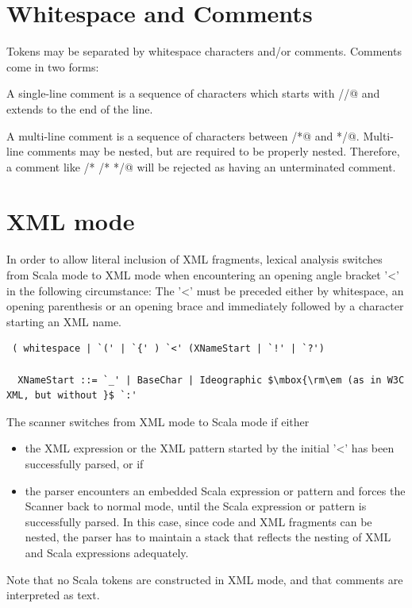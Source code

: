 \section{Whitespace and Comments}

Tokens may be separated by whitespace characters
and/or comments. Comments come in two forms:

A single-line comment is a sequence of characters which starts with
\lstinline@//@ and extends to the end of the line.

A multi-line comment is a sequence of characters between
\lstinline@/*@ and \lstinline@*/@. Multi-line comments may be nested,
but are required to be properly nested.  Therefore, a comment like
\lstinline@/* /* */@ will be rejected as having an unterminated
comment.

\section{XML mode\label{sec::xmlMode}}

In order to allow literal inclusion of XML fragments, lexical analysis
switches from Scala mode to XML mode when encountering an opening
angle bracket '<' in the following circumstance: The '<' must be
preceded either by whitespace, an opening parenthesis or an opening
brace and immediately followed by a character starting an XML name.

\syntax\begin{lstlisting}
 ( whitespace | `(' | `{' ) `<' (XNameStart | `!' | `?')

  XNameStart ::= `_' | BaseChar | Ideographic $\mbox{\rm\em (as in W3C XML, but without }$ `:'
\end{lstlisting}

The scanner switches from XML mode to Scala mode if either
\begin{itemize}
\item the XML expression or the XML pattern started by the initial '<' has been 
successfully parsed, or if

\item the parser encounters an embedded Scala expression or pattern and 
forces the Scanner 
back to normal mode, until the Scala expression or pattern is
successfully parsed. In this case, since code and XML fragments can be
nested, the parser has to maintain a stack that reflects the nesting
of XML and Scala expressions adequately.
\end{itemize}

Note that no Scala tokens are constructed in XML mode, and that comments are interpreted
as text.

